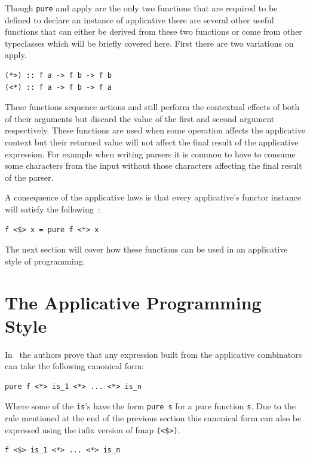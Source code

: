 Though \texttt{pure} and apply are the only two functions that are required to be defined to declare an instance of applicative there are several other useful functions that can either be derived from these two functions or come from other typeclasses which will be briefly covered here. First there are two variations on apply.

\begin{lstlisting}[frame=tblr]
(*>) :: f a -> f b -> f b
(<*) :: f a -> f b -> f a
\end{lstlisting}

These functions sequence actions and still perform the contextual effects of both of their arguments but discard the value of the first and second argument respectively. These functions are used when some operation affects the applicative context but their returned value will not affect the final result of the applicative expression. For example when writing parsers it is common to have to consume some characters from the input without those characters affecting the final result of the parser.

A consequence of the applicative laws is that every applicative's functor instance will satisfy the following~\citep{control.applicative}: 

\begin{lstlisting}[frame=tblr]
f <$> x = pure f <*> x
\end{lstlisting}

The next section will cover how these functions can be used in an applicative style of programming. 

\section{The Applicative Programming Style}
\label{sec:appProgStyle}

In~\cite{mcbrideIdioms} the authors prove that any expression built from the applicative combinators can take the following canonical form:

\begin{lstlisting}[frame=tblr]
pure f <*> is_1 <*> ... <*> is_n
\end{lstlisting}


Where some of the \texttt{is}'s have the form \texttt{pure s} for a pure function \texttt{s}. Due to the rule mentioned at the end of the previous section this canonical form can also be expressed using the infix version of fmap \texttt{(<\$>)}. 

\begin{lstlisting}[frame=tblr]
f <$> is_1 <*> ... <*> is_n
\end{lstlisting}


